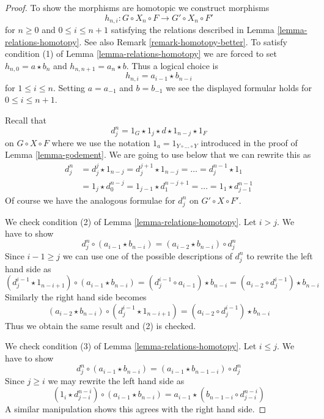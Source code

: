 \documentclass{stacks-project}
\theoremstyle{plain}
\theoremstyle{definition}
\theoremstyle{remark}
\numberwithin{equation}{subsection}
\begin{document}
\begin{proof}
To show the morphisms are homotopic we construct morphisms
$$
h_{n, i} : G \circ X_n \circ F \to G' \circ X_n \circ F'
$$
for $n \geq 0$ and $0 \leq i \leq n + 1$
satisfying the relations described in Lemma \ref{lemma-relations-homotopy}.
See also Remark \ref{remark-homotopy-better}. To satisfy condition (1)
of Lemma \ref{lemma-relations-homotopy} we are forced to set
$h_{n, 0} = a \star b_n$ and $h_{n , n + 1} = a_n \star b$.
Thus a logical choice is
$$
h_{n , i} = a_{i - 1} \star b_{n - i}
$$
for $1 \leq i \leq n$. Setting $a = a_{-1}$ and $b = b_{-1}$ we
see the displayed formular holds for $0 \leq i \leq n + 1$.

\medskip\noindent
Recall that
$$
d^n_j = 1_G \star 1_j \star d \star 1_{n - j} \star 1_F
$$
on $G \circ X \circ F$ where we use
the notation $1_a = 1_{Y \circ \ldots \circ Y}$ introduced
in the proof of Lemma \ref{lemma-godement}. We are going to use below
that we can rewrite this as
\begin{align*}
d^n_j
& =
d^j_j \star 1_{n - j} =
d^{j + 1}_j \star 1_{n - j} = \ldots = d^{n - 1}_j \star 1_1 \\
& =
1_j \star d^{n - j}_0 = 1_{j - 1} \star d^{n - j + 1}_1 = \ldots =
1_1 \star d^{n - 1}_{j - 1}
\end{align*}
Of course we have the analogous formulae for $d^n_j$ on $G' \circ X \circ F'$.

\medskip\noindent
We check condition (2) of Lemma \ref{lemma-relations-homotopy}.
Let $i > j$. We have to show
$$
d^n_j \circ (a_{i - 1} \star b_{n - i}) =
(a_{i - 2} \star b_{n - i}) \circ d^n_j
$$
Since $i - 1 \geq j$ we can use one of the possible descriptions of
$d^n_j$ to rewrite the left hand side as
$$
(d^{i - 1}_j \star 1_{n - i + 1}) \circ (a_{i - 1} \star b_{n - i}) =
(d^{i - 1}_j \circ a_{i - 1}) \star b_{n - i} =
(a_{i - 2} \circ d^{i - 1}_j) \star b_{n - i}
$$
Similarly the right hand side becomes
$$
(a_{i - 2} \star b_{n - i}) \circ (d^{i - 1}_j \star 1_{n - i + 1}) =
(a_{i - 2} \circ d^{i - 1}_j) \star b_{n - i}
$$
Thus we obtain the same result and (2) is checked.

\medskip\noindent
We check condition (3) of Lemma \ref{lemma-relations-homotopy}.
Let $i \leq j$. We have to show
$$
d^n_j \circ (a_{i - 1} \star b_{n - i}) =
(a_{i - 1} \star b_{n - 1 - i}) \circ d^n_j
$$
Since $j \geq i$ we may rewrite the left hand side as
$$
(1_i \star d^{n - i}_{j - i}) \circ (a_{i - 1} \star b_{n - i}) =
a_{i - 1} \star (b_{n - 1 - i} \circ d^{n - i}_{j - i})
$$
A similar manipulation shows this agrees with the right hand side.


\end{proof}
\end{document}
